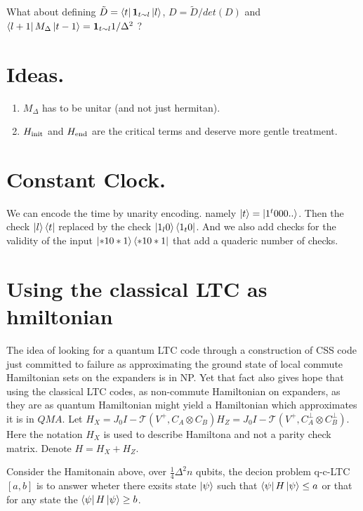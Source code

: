 \documentclass[manuscript,screen,review]{acmart}
\begin{document}
What about defining $\tilde{D} = \bra{t} \mathbf{1}_{t\sim l} \ket{l} $, $D = \tilde{D}/det(D)$ and $\bra{l+1} M_{\Delta} \ket{t-1}  =  \mathbf{1}_{t\sim l} 1/\Delta^{2}$ ?  

\section{Ideas.}
\begin{enumerate}
  \item $M_{\Delta}$ has to be unitar (and not just hermitan).  
  \item $H_{\text{init}}$ and $H_{\text{end}}$ are the critical terms and deserve more gentle treatment.
\end{enumerate}

\section{Constant Clock.}

We can encode the time by unarity encoding. namely $\ket{t} = \ket{1^{t}000..}$. Then the check $\ket{l}\bra{t}$ replaced by the check $\ket{1_{l}0}\bra{1_{t}0}$.  And we also add checks for the validity of the input $ \ket{*10*1}\bra{*10*1} $ that add a quaderic number of checks.  

\section{Using the classical LTC as hmiltonian} 
The idea of looking for a quantum LTC code through a construction of CSS code just committed to failure as approximating the ground state of local commute Hamiltonian sets on the expanders is in NP. Yet that fact also gives hope that using the classical LTC codes, as non-commute Hamiltonian on expanders, as they are as quantum Hamiltonian might yield a Hamiltonian which approximates it is in $QMA$. Let $H_{X} = J_{0}I - \mathcal{T} ( V^{+}, C_{A}\otimes C_{B}) $$H_{Z} = J_{0}I -   \mathcal{T} ( V^{+}, C_{A}^{\perp}\otimes C_{B}^{\perp}) $. Here the notation $H_{X}$ is used to describe Hamiltona and not a parity check matrix.  Denote $H = H_{X} + H_{Z}$.

\begin{definition}
  Consider the Hamitonain above, over $\frac{1}{4}\Delta^{2}n$ qubits, the decion problem q-c-LTC$[a,b]$ is to answer wheter there exsits state $\ket{\psi}$ such that $\bra{\psi}H\ket{\psi} \le a $ or that for any state the $\bra{\psi}H\ket{\psi} \ge  b $. 
\end{definition}
\end{document}
